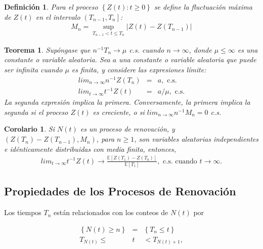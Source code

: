 \documentclass{article}
\newtheorem{Def}{Definición}[section]
\newtheorem{Teo}{Teorema}[section]
\newtheorem{Coro}{Corolario}[section]
\newcommand{\esp}{\mathbb{E}}
\numberwithin{equation}{section}
\begin{document}
\begin{Def}
Para el proceso $\left\{Z\left(t\right):t\geq0\right\}$ se define la fluctuaci\'on m\'axima de $Z\left(t\right)$ en el intervalo $\left(T_{n-1},T_{n}\right]$:
\begin{eqnarray*}
M_{n}=\sup_{T_{n-1}<t\leq T_{n}}|Z\left(t\right)-Z\left(T_{n-1}\right)|
\end{eqnarray*}
\end{Def}

\begin{Teo}
Sup\'ongase que $n^{-1}T_{n}\rightarrow\mu$ c.s. cuando $n\rightarrow\infty$, donde $\mu\leq\infty$ es una constante o variable aleatoria. Sea $a$ una constante o variable aleatoria que puede ser infinita cuando $\mu$ es finita, y considere las expresiones l\'imite:
\begin{eqnarray}
lim_{n\rightarrow\infty}n^{-1}Z\left(T_{n}\right)&=&a,\textrm{ c.s.}\\
lim_{t\rightarrow\infty}t^{-1}Z\left(t\right)&=&a/\mu,\textrm{ c.s.}
\end{eqnarray}
La segunda expresi\'on implica la primera. Conversamente, la primera implica la segunda si el proceso $Z\left(t\right)$ es creciente, o si $lim_{n\rightarrow\infty}n^{-1}M_{n}=0$ c.s.
\end{Teo}

\begin{Coro}
Si $N\left(t\right)$ es un proceso de renovaci\'on, y $\left(Z\left(T_{n}\right)-Z\left(T_{n-1}\right),M_{n}\right)$, para $n\geq1$, son variables aleatorias independientes e id\'enticamente distribuidas con media finita, entonces,
\begin{eqnarray}
lim_{t\rightarrow\infty}t^{-1}Z\left(t\right)\rightarrow\frac{\esp\left[Z\left(T_{1}\right)-Z\left(T_{0}\right)\right]}{\esp\left[T_{1}\right]},\textrm{ c.s. cuando  }t\rightarrow\infty.
\end{eqnarray}
\end{Coro}
%
\subsection{Propiedades de los Procesos de Renovaci\'on}
%

Los tiempos $T_{n}$ est\'an relacionados con los conteos de $N\left(t\right)$ por

\begin{eqnarray*}
\left\{N\left(t\right)\geq n\right\}&=&\left\{T_{n}\leq t\right\}\\
T_{N\left(t\right)}\leq &t&<T_{N\left(t\right)+1},
\end{eqnarray*}
\end{document}
